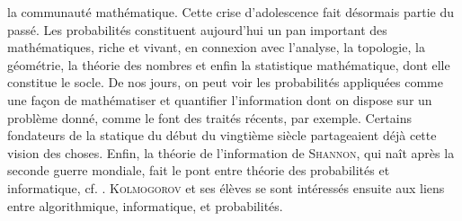 {{la communauté mathématique. Cette crise d'adolescence fait désormais partie du
passé. Les probabilités constituent aujourd'hui un pan important des
mathématiques, riche et vivant, en connexion avec l'analyse, la topologie, la
géométrie, la théorie des nombres et enfin la statistique mathématique, dont
elle constitue le socle. De nos jours, on peut voir les probabilités
appliquées comme une façon de mathématiser et quantifier l'information dont on
dispose sur un problème donné, comme le font des traités récents,
\cite{applebaum} par exemple. Certains fondateurs de la statique du début du
vingtième siècle partageaient déjà cette vision des choses. Enfin, la théorie
de l'information de \textsc{Shannon}, qui naît après la seconde guerre
mondiale, fait le pont entre théorie des probabilités et informatique, cf.
\cite{applebaum,dion,cover-thomas}. \textsc{Kolmogorov} et ses élèves se sont
intéressés ensuite aux liens entre algorithmique, informatique, et
probabilités.

}}
